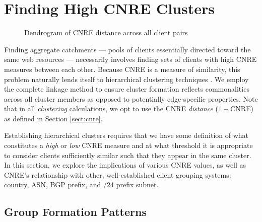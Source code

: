 \section{Finding High CNRE Clusters} \label{sect:finding}

\begin{figure*}
    \caption{Dendrogram of CNRE distance across all client pairs}
    \label{fig:dendrogram}
\end{figure*}

Finding aggregate catchments --- pools of clients essentially directed toward
the same web resources --- necessarily involves finding sets of clients with high
CNRE measures between each other. Because CNRE is a measure of similarity, this
problem naturally lends itself to hierarchical clustering techniques \cite{murtagh1983survey}. 
We employ the complete linkage method to ensure cluster formation reflects commonalities
across all cluster members as opposed to potentially edge-specific properties.
Note that in all \emph{clustering} calculations, we opt to use the CNRE \emph{distance}
(\(1-\)CNRE) as defined in Section \ref{sect:cnre}.

Establishing hierarchical clusters requires that we have some definition of what
constitutes a \emph{high} or \emph{low} CNRE measure and at what threshold it is
appropriate to consider clients sufficiently similar such that they appear in
the same cluster. In this section, we explore the implications of various CNRE
values, as well as CNRE's relationship with other, well-established client grouping
systems: country, ASN, BGP prefix, and /24 prefix subnet.


\subsection{Group Formation Patterns}
\label{s:formation}

